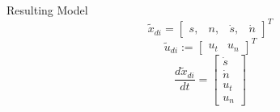 \documentclass[shortpres,aspectratio=43]{beamer}
\begin{document}
\begin{frame}{Resulting Model}
  \begin{equation}
    \tilde{x}_{di} = \begin{bmatrix} s, & n, & \dot{s}, & \dot{n} \end{bmatrix}^T
  \end{equation}
  \begin{equation}
    \tilde{u}_{di} := \begin{bmatrix}
      u_t &
      u_n
    \end{bmatrix}^T
  \end{equation}
  \begin{equation}
    \frac{d\tilde{x}_{di}}{dt} = \begin{bmatrix}
      \dot{s} \\
      \dot{n} \\
      u_t     \\
      u_n
    \end{bmatrix}
  \end{equation}
\end{frame}
\end{document}
